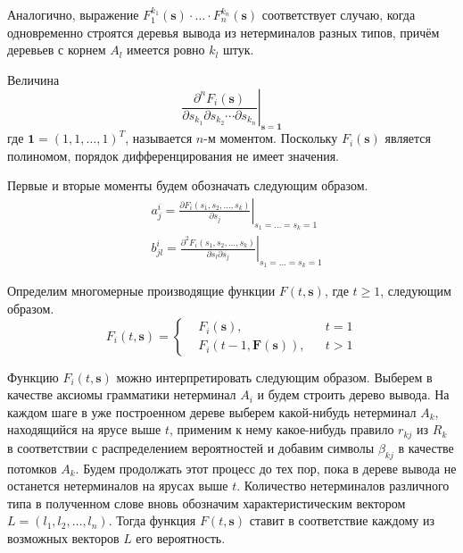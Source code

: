 \documentclass[10pt]{article}
\renewcommand{\geq}{\geqslant}
\begin{document}
Аналогично, выражение $F_1^{k_1}(\mathbf{s}) \cdot \ldots \cdot F_n^{k_n}(\mathbf{s})$ соответствует случаю, когда одновременно строятся деревья вывода из нетерминалов разных типов, причём деревьев с корнем $A_l$ имеется ровно $k_l$ штук.

Величина
\begin{equation*}
	\left.\frac{\partial^n F_i(\mathbf{s})}{\partial s_{k_1} \partial s_{k_2} \cdots \partial s_{k_n}}\right|_{\mathbf{s} = \mathbf{1}}
\end{equation*}
где $\mathbf{1} = (1, 1, \ldots, 1)^T$, называется $n$-м моментом. Поскольку $F_i(\mathbf{s})$ является полиномом, порядок дифференцирования не имеет значения.

Первые и вторые моменты будем обозначать следующим образом.
\begin{equation}
\label{eq:aij-bij-definition}
\begin{split}
	&a^i_j  = \left. \frac{\partial F_i(s_1, s_2, \ldots, s_k)}{\partial s_j} \right|_{s_1 = \ldots = s_k = 1} \\
	&b^i_{jl} = \left. \frac{\partial^2 F_i(s_1, s_2, \ldots, s_k)}{\partial s_l \partial s_j} \right|_{s_1 = \ldots = s_k = 1}
\end{split}
\end{equation}

Определим многомерные производящие функции $F(t, \mathbf{s})$, где $t \geq 1$, следующим образом.
\begin{equation*}
	F_i(t, \mathbf{s}) = \left\{
	\begin{split}
		&F_i(\mathbf{s}), & &t = 1 \\
		&F_i(t-1, \mathbf{F}(\mathbf{s})), & &t > 1
	\end{split}
	\right.
\end{equation*}

Функцию $F_i(t, \mathbf{s})$ можно интерпретировать следующим образом. Выберем в качестве аксиомы грамматики нетерминал $A_i$ и будем строить дерево вывода. На каждом шаге в уже построенном дереве выберем какой-нибудь нетерминал $A_k$, находящийся на ярусе выше $t$, применим к нему какое-нибудь правило $r_{kj}$ из $R_k$ в соответствии с распределением вероятностей и добавим символы $\beta_{kj}$ в качестве потомков $A_k$. Будем продолжать этот процесс до тех пор, пока в дереве вывода не останется нетерминалов на ярусах выше $t$. Количество нетерминалов различного типа в полученном слове вновь обозначим характеристическим вектором $L = (l_1, l_2, \ldots, l_n)$. Тогда функция $F(t, \mathbf{s})$ ставит в соответствие каждому из возможных векторов $L$ его вероятность.
\end{document}
